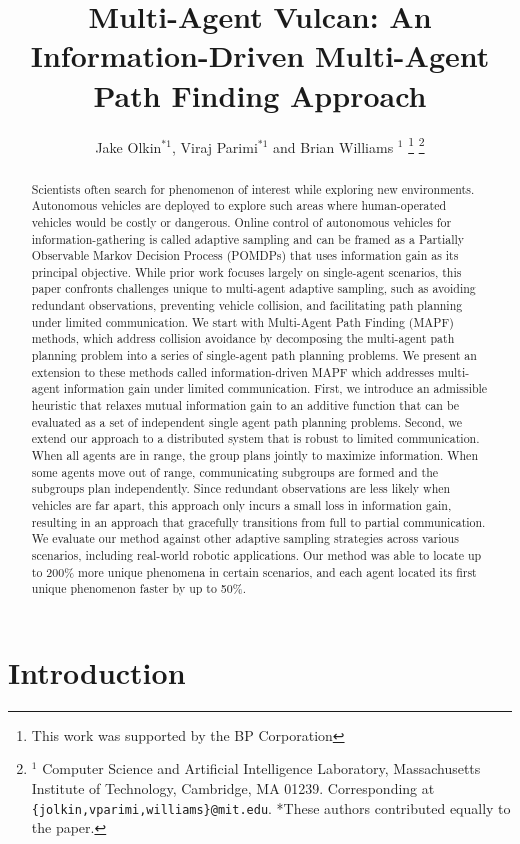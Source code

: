 \documentclass[letterpaper, 10 pt, conference]{IEEEConference}
\title{\LARGE \bf
Multi-Agent Vulcan: An Information-Driven Multi-Agent Path Finding Approach
}
\author{Jake Olkin$^{*1}$, Viraj Parimi$^{*1}$ and Brian Williams $^{1}$
\thanks{This work was supported by the BP Corporation}
\thanks{$^{1}$ Computer Science and Artificial Intelligence Laboratory, Massachusetts Institute of Technology, Cambridge, MA 01239. Corresponding at {\tt\footnotesize \{jolkin,vparimi,williams\}@mit.edu}. *These authors contributed equally to the paper.}
}
\begin{document}
\maketitle
\thispagestyle{empty}
\pagestyle{empty}

\begin{abstract}
Scientists often search for phenomenon of interest while exploring new environments. Autonomous vehicles are deployed to explore such areas where human-operated vehicles would be costly or dangerous. Online control of autonomous vehicles for information-gathering is called adaptive sampling and can be framed as a Partially Observable Markov Decision Process (POMDPs) that uses information gain as its principal objective. While prior work focuses largely on single-agent scenarios, this paper confronts challenges unique to multi-agent adaptive sampling, such as avoiding redundant observations, preventing vehicle collision, and facilitating path planning under limited communication. We start with Multi-Agent Path Finding (MAPF) methods, which address collision avoidance by decomposing the multi-agent path planning problem into a series of single-agent path planning problems. We present an extension to these methods called information-driven MAPF which addresses multi-agent information gain under limited communication. First, we introduce an admissible heuristic that relaxes mutual information gain to an additive function that can be evaluated as a set of independent single agent path planning problems. Second, we extend our approach to a distributed system that is robust to limited communication. When all agents are in range, the group plans jointly to maximize information. When some agents move out of range, communicating subgroups are formed and the subgroups plan independently. Since redundant observations are less likely when vehicles are far apart, this approach only incurs a small loss in information gain, resulting in an approach that gracefully transitions from full to partial communication. We evaluate our method against other adaptive sampling strategies across various scenarios, including real-world robotic applications. Our method was able to locate up to 200\% more unique phenomena in certain scenarios, and each agent located its first unique phenomenon faster by up to 50\%.
\end{abstract}

\section{Introduction}
\end{document}
